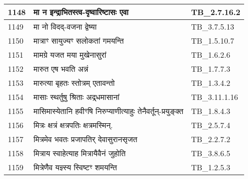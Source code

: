 \documentclass[17pt]{extarticle}
\begin{document}
\begin{longtable}{||p{0.4in}||p{4.9in}||p{0.9in}||}
    \hline
        
    1148 & मा न इन्द्राभितस्त्व{-}दृष्वारिष्टासः एवा & TB\_2.7.16.2       \\
    
    \hline
        
    1149 & मा नो विदद्{-}वजना द्वेष्या & TB\_3.7.5.13       \\
    
    \hline
        
    1150 & मात्राꣳ सायुज्यꣳ सलोकतां गमयन्ति & TB\_1.5.10.7       \\
    
    \hline
        
    1151 & मामग्रे यजत मया मुखेनासुरां & TB\_1.6.2.6       \\
    
    \hline
        
    1152 & मारुत एष भवति अन्नं & TB\_1.7.7.3       \\
    
    \hline
        
    1153 & मारुत्या बृहतः स्तोत्रम् एतावन्तो & TB\_1.3.4.2       \\
    
    \hline
        
    1154 & मासाः स्थर्तुषु श्रिताः अद्र्धमासानां & TB\_3.11.1.16       \\
    
    \hline
        
    1155 & मासिमास्येतानि हवीꣳषि निरुप्याणीत्याहुः तेनैवर्तून्{-}प्रयुङ्क्त & TB\_1.8.4.3       \\
    
    \hline
        
    1156 & मित्रः क्षत्रं क्षत्रपतिः क्षत्रमस्मिन्. & TB\_2.5.7.4       \\
    
    \hline
        
    1157 & मित्रमेव भवतः प्रजापतिर् देवासुरानसृजत & TB\_2.2.7.2       \\
    
    \hline
        
    1158 & मित्राय स्वाहेत्याह मित्रायैवैनं जुहोति & TB\_3.8.6.5       \\
    
    \hline
        
    1159 & मित्रेणैव यज्ञ्स्य स्विष्टꣳ शमयन्ति & TB\_1.2.5.3       \\
    
    \hline
        

\end{longtable}
\end{document}
